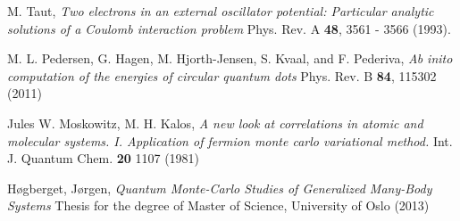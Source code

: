 \documentclass[english, a4paper]{article}
\begin{document}
\newpage

\begin{thebibliography}{9}


 M. Taut, 
 \textit{Two electrons in an external oscillator potential: Particular analytic solutions
 of a Coulomb interaction problem}
 Phys. Rev. A {\bf 48}, 3561 - 3566 (1993).
 
 M. L. Pedersen, G. Hagen, M. Hjorth-Jensen, S. Kvaal, and F. Pederiva, 
 \textit{Ab inito computation of the energies of circular quantum dots}
 Phys. Rev. B {\bf 84}, 115302 (2011)
 
 Jules W. Moskowitz, M. H. Kalos,
 \textit{A new look at correlations in atomic and molecular systems. 
         I. Application of fermion monte carlo variational method.}
 Int. J. Quantum Chem. {\bf 20} 1107 (1981)
 
 Høgberget, Jørgen,
 \textit{Quantum Monte-Carlo Studies of Generalized Many-Body Systems}
 Thesis for the degree of Master of Science, University of Oslo (2013)

\end{thebibliography}
\end{document}
